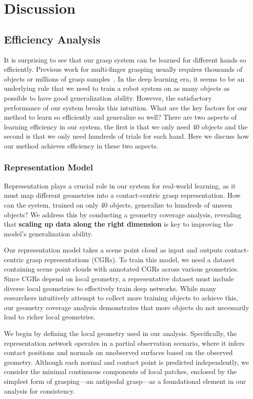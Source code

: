 
\section{Discussion}

\subsection{Efficiency Analysis}
It is surprising to see that our grasp system can be learned for different hands so efficiently. Previous work for multi-finger grasping usually requires thousands of objects or millions of grasp samples~\cite {wang2023dexgraspnet, lum2024dextrahg,
singh2025dextrahrgb}. In the deep learning era, it seems to be an underlying rule that we need to train a robot system on as many objects as possible to have good generalization ability. However, the satisfactory performance of our system breaks this intuition. What are the key factors for our method to learn so efficiently and generalize so well? There are two aspects of learning efficiency in our system, the first is that we only need 40 objects and the second is that we only need hundreds of trials for each hand. Here we discuss how our method achieves efficiency in these two aspects.


\subsubsection*{Representation Model}
Representation plays a crucial role in our system for real-world learning, as it must map different geometries into a contact-centric grasp representation. How can the system, trained on only 40 objects, generalize to hundreds of unseen objects? We address this by conducting a geometry coverage analysis, revealing that \textbf{scaling up data along the right dimension} is key to improving the model's generalization ability.

Our representation model takes a scene point cloud as input and outputs contact-centric grasp representations (CGRs). To train this model, we need a dataset containing scene point clouds with annotated CGRs across various geometries. Since CGRs depend on local geometry, a representative dataset must include diverse local geometries to effectively train deep networks. While many researchers intuitively attempt to collect more training objects to achieve this, our geometry coverage analysis demonstrates that more objects do not necessarily lead to richer local geometries.

We begin by defining the local geometry used in our analysis. Specifically, the representation network operates in a partial observation scenario, where it infers contact positions and normals on unobserved surfaces based on the observed geometry. Although each normal and contact point is predicted independently, we consider the minimal continuous components of local patches, enclosed by the simplest form of grasping—an antipodal grasp—as a foundational element in our analysis for consistency.


